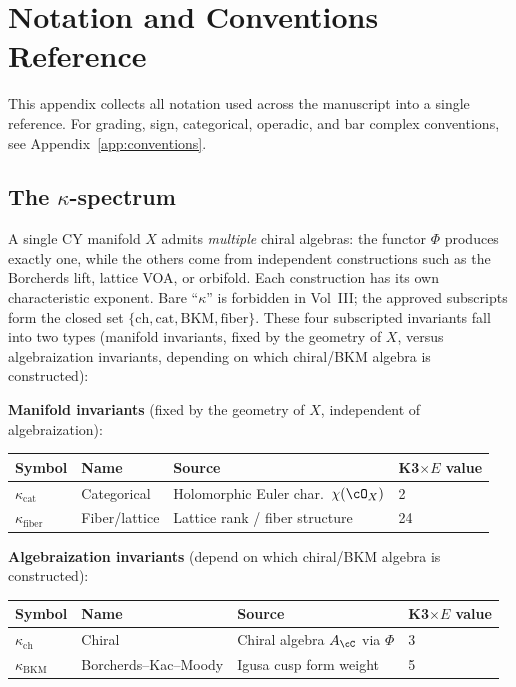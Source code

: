 \chapter{Notation and Conventions Reference}
\label{app:notation}

This appendix collects all notation used across the manuscript into a single
reference.  For grading, sign, categorical, operadic, and bar complex
conventions, see Appendix~\ref{app:conventions}.

\section{The \texorpdfstring{$\kappa$}{kappa}-spectrum}
\label{sec:notation-kappa}

A single CY manifold $X$ admits \emph{multiple} chiral algebras: the
functor $\Phi$ produces exactly one, while the others come from
independent constructions such as the Borcherds lift, lattice VOA, or
orbifold.  Each construction has its own characteristic exponent.
Bare ``$\kappa$'' is forbidden in Vol~III; the approved subscripts form
the closed set $\{\mathrm{ch}, \mathrm{cat}, \mathrm{BKM},
\mathrm{fiber}\}$.  These four subscripted invariants fall into two
types (manifold invariants, fixed by the geometry of $X$, versus
algebraization invariants, depending on which chiral/BKM algebra is
constructed):

\medskip\noindent
\textbf{Manifold invariants} (fixed by the geometry of $X$, independent of algebraization):
\begin{center}
\begin{tabular}{@{}llll@{}}
\toprule
\textbf{Symbol} & \textbf{Name} & \textbf{Source} & \textbf{K3$\times E$ value} \\
\midrule
$\kappa_{\mathrm{cat}}$ & Categorical & Holomorphic Euler char.\ $\chi(\cO_X)$ & 2 \\
$\kappa_{\mathrm{fiber}}$ & Fiber/lattice & Lattice rank / fiber structure & 24 \\
\bottomrule
\end{tabular}
\end{center}

\noindent
\textbf{Algebraization invariants} (depend on which chiral/BKM algebra is constructed):
\begin{center}
\begin{tabular}{@{}llll@{}}
\toprule
\textbf{Symbol} & \textbf{Name} & \textbf{Source} & \textbf{K3$\times E$ value} \\
\midrule
$\kappa_{\mathrm{ch}}$ & Chiral & Chiral algebra $A_\cC$ via $\Phi$ & 3 \\
$\kappa_{\mathrm{BKM}}$ & Borcherds--Kac--Moody & Igusa cusp form weight & 5 \\
\bottomrule
\end{tabular}
\end{center}

